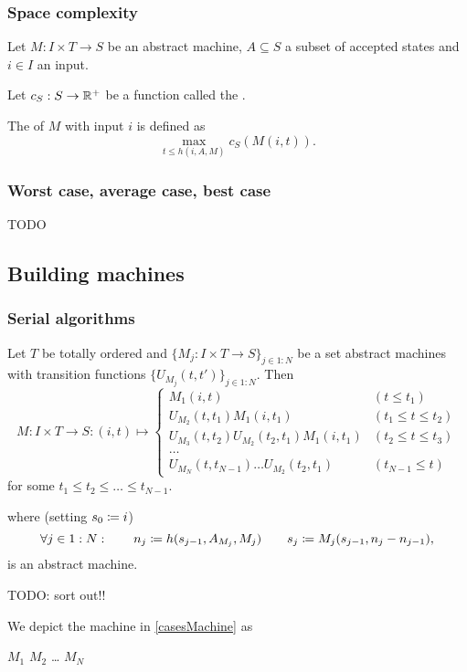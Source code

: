 \subsubsection{Space complexity}
\begin{definition}
Let  $M: I\times T \to S$ be an abstract machine, $A \subseteq S$ a subset of accepted states and $i\in I$ an input.

Let $c_S: S\to \mathbb{R}^+$ be a function called the .

The  of $M$ with input $i$ is defined as
\[ \max_{t\leq h(i,A,M)} c_S(M(i,t)). \]
\end{definition}

\subsubsection{Worst case, average case, best case}
TODO

\subsection{Building machines}
\subsubsection{Serial algorithms}
\begin{proposition} \label{casesMachine}
Let $T$ be totally ordered and $\{M_j: I\times T \to S\}_{j\in 1:N}$ be a set abstract machines with transition functions $\{U_{M_j}(t,t')\}_{j\in 1:N}$. Then
\[ M: I\times T \to S: (i,t) \mapsto \begin{cases}
M_1(i, t) & (t \leq t_1) \\
U_{M_2}(t, t_1)M_1(i, t_1) & (t_1\leq t \leq t_2) \\
U_{M_3}(t, t_2)U_{M_2}(t_2, t_1)M_1(i, t_1) & (t_2\leq t \leq t_3) \\
\hdots \\
U_{M_{N}}(t,t_{N-1})\ldots U_{M_2}(t_2, t_1) & (t_{N-1}\leq t)
\end{cases} \]
for some $t_1 \leq t_2 \leq \ldots \leq t_{N-1}$.


where (setting $s_0\coloneqq i$)
\[ \forall j\in 1:N : \qquad n_j \coloneqq h(s_{j-1}, A_{M_{j}}, M_j) \qquad s_j \coloneqq M_j(s_{j-1}, n_j-n_{j-1}), \]
is an abstract machine.
\end{proposition}

TODO: sort out!!

We depict the machine in \ref{casesMachine} as
\begin{centeredAlgorithm}
$M_1$\;
$M_2$\;
\ldots \;
$M_N$\;
\end{centeredAlgorithm}

